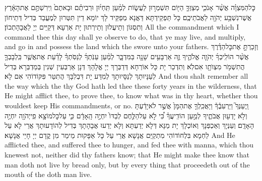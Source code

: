 \newperek
{}%
{כׇּל\maqqaf הַמִּצְוָ֗ה אֲשֶׁ֨ר אָנֹכִ֧י מְצַוְּךָ֛ הַיּ֖וֹם תִּשְׁמְר֣וּן לַעֲשׂ֑וֹת לְמַ֨עַן תִּֽחְי֜וּן וּרְבִיתֶ֗ם וּבָאתֶם֙ וִֽירִשְׁתֶּ֣ם אֶת\maqqaf הָאָ֔רֶץ אֲשֶׁר\maqqaf נִשְׁבַּ֥ע יְהֹוָ֖ה לַאֲבֹתֵיכֶֽם׃}
{כָּל תַּפְקֵידְתָּא דַּאֲנָא מְפַקֵּיד לָךְ יוֹמָא דֵין תִּטְּרוּן לְמֶעֱבַד בְּדִיל דְּתֵיחוֹן וְתִסְגּוֹן וְתֵיעֲלוּן וְתֵירְתוּן יָת אַרְעָא דְּקַיֵּים יְיָ לַאֲבָהָתְכוֹן׃}
{All the commandment which I command thee this day shall ye observe to do, that ye may live, and multiply, and go in and possess the land which the \lord\space swore unto your fathers.}{}
{וְזָכַרְתָּ֣ אֶת\maqqaf כׇּל\maqqaf הַדֶּ֗רֶךְ אֲשֶׁ֨ר הוֹלִֽיכְךָ֜ יְהֹוָ֧ה אֱלֹהֶ֛יךָ זֶ֛ה אַרְבָּעִ֥ים שָׁנָ֖ה בַּמִּדְבָּ֑ר לְמַ֨עַן עַנֹּֽתְךָ֜ לְנַסֹּֽתְךָ֗ לָדַ֜עַת אֶת\maqqaf אֲשֶׁ֧ר בִּֽלְבָבְךָ֛ הֲתִשְׁמֹ֥ר מִצְוֺתָ֖ו אִם\maqqaf לֹֽא׃}
{וְתִדְכַר יָת כָּל אוֹרְחָא דְּדַבְּרָךְ יְיָ אֱלָהָךְ דְּנָן אַרְבְּעִין שְׁנִין בְּמַדְבְּרָא בְּדִיל לְעַנָּיוּתָךְ לְנַסָּיוּתָךְ לְמִדַּע יָת דִּבְלִבָּךְ הֲתִטַּר פִּקּוֹדוֹהִי אִם לָא׃}
{And thou shalt remember all the way which the \lord\space thy God hath led thee these forty years in the wilderness, that He might afflict thee, to prove thee, to know what was in thy heart, whether thou wouldest keep His commandments, or no.}{}
{וַֽיְעַנְּךָ֮ וַיַּרְעִבֶ֒ךָ֒ וַיַּאֲכִֽלְךָ֤ אֶת\maqqaf הַמָּן֙ אֲשֶׁ֣ר לֹא\maqqaf יָדַ֔עְתָּ וְלֹ֥א יָדְע֖וּן אֲבֹתֶ֑יךָ לְמַ֣עַן הוֹדִֽיעֲךָ֗ כִּ֠י לֹ֣א עַל\maqqaf הַלֶּ֤חֶם לְבַדּוֹ֙ יִחְיֶ֣ה הָֽאָדָ֔ם כִּ֛י עַל\maqqaf כׇּל\maqqaf מוֹצָ֥א פִֽי\maqqaf יְהֹוָ֖ה יִחְיֶ֥ה הָאָדָֽם׃}
{וְעַנְּיָךְ וְאַכְפְּנָךְ וְאוֹכְלָךְ יָת מַנָּא דְּלָא יְדַעְתָּא וְלָא יְדַעוּ אֲבָהָתָךְ בְּדִיל לְהוֹדָעוּתָךְ אֲרֵי לָא עַל לַחְמָא בִּלְחוֹדוֹהִי מִתְקַיַּם אֲנָשָׁא אֲרֵי עַל כָּל אַפָּקוּת מֵימַר מִן קֳדָם יְיָ חָיֵי אֲנָשָׁא׃}
{And He afflicted thee, and suffered thee to hunger, and fed thee with manna, which thou knewest not, neither did thy fathers know; that He might make thee know that man doth not live by bread only, but by every thing that proceedeth out of the mouth of the \lord\space doth man live.}{}
